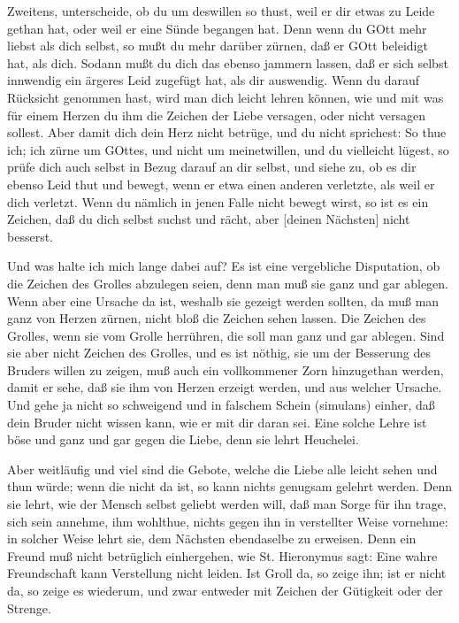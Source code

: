 Zweitens, unterscheide, ob du um deswillen so thust, weil er dir etwas zu Leide gethan hat, oder weil er eine Sünde begangen hat. Denn
wenn du GOtt mehr liebst als dich selbst, so mußt du mehr darüber zürnen, daß er GOtt beleidigt hat, als dich. Sodann mußt du dich das ebenso jammern lassen, daß er sich selbst innwendig ein ärgeres Leid zugefügt hat, als dir auswendig. Wenn du darauf Rücksicht genommen hast, wird man dich leicht lehren können, wie und mit was für einem Herzen du ihm die Zeichen der Liebe versagen, oder nicht versagen sollest. Aber damit dich dein Herz nicht betrüge, und du nicht sprichest: So thue ich; ich zürne um GOttes, und nicht um meinetwillen, und du vielleicht lügest, so prüfe dich auch selbst in Bezug darauf an dir selbst, und siehe zu, ob es dir ebenso Leid thut und bewegt, wenn er etwa einen anderen verletzte, als weil er dich verletzt. Wenn du nämlich in jenen Falle nicht bewegt wirst, so ist es ein Zeichen, daß du dich selbst suchst und rächt, aber [deinen Nächsten] nicht besserst.

Und was halte ich mich lange dabei auf? Es ist eine vergebliche Disputation, ob die Zeichen des Grolles abzulegen seien, denn man muß sie ganz und gar ablegen. Wenn aber eine Ursache da ist, weshalb sie gezeigt werden sollten, da muß man ganz von Herzen zürnen, nicht bloß die Zeichen sehen lassen. Die Zeichen des Grolles, wenn sie vom Grolle herrühren, die soll man ganz und gar ablegen. Sind sie aber nicht Zeichen des Grolles, und es ist nöthig, sie um der Besserung des Bruders willen zu zeigen, muß auch ein vollkommener Zorn hinzugethan werden, damit er sehe, daß sie ihm von Herzen erzeigt werden, und aus welcher Ursache. Und gehe ja nicht so schweigend und in falschem Schein (simulans) einher, daß dein Bruder nicht wissen kann, wie er mit dir daran sei. Eine solche Lehre ist böse und ganz und gar gegen die Liebe, denn sie lehrt Heuchelei.

Aber weitläufig und viel sind die Gebote, welche die Liebe alle leicht sehen und thun würde; wenn die nicht da ist, so kann nichts genugsam gelehrt werden. Denn sie lehrt, wie der Mensch selbst geliebt werden will, daß man Sorge für ihn trage, sich sein annehme, ihm wohlthue, nichts gegen ihn in verstellter Weise vornehme: in solcher Weise lehrt sie, dem Nächsten ebendaselbe zu erweisen. Denn ein Freund muß nicht betrüglich einhergehen, wie St. Hieronymus sagt: Eine wahre Freundschaft kann Verstellung nicht leiden. Ist Groll da, so zeige ihn; ist er nicht da, so zeige es wiederum, und zwar entweder mit Zeichen der Gütigkeit oder der Strenge.

